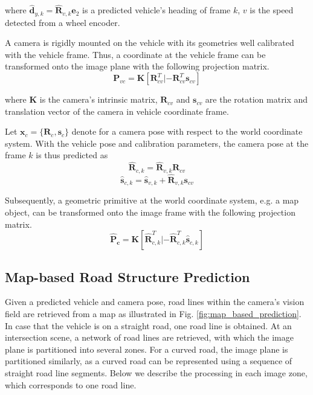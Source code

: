 \documentclass[letterpaper, 10 pt, conference]{ieeeconf}  %
\begin{document}
where $\hat{\mathbf{d}}_{y,k}=\hat{\mathbf{R}}_{v,k}\mathbf{e}_2$ is a predicted vehicle's heading of frame $k$, $v$ is the speed detected from a wheel encoder.

A camera is rigidly mounted on the vehicle with its geometries well calibrated with the vehicle frame. Thus, a coordinate at the vehicle frame can be transformed onto the image plane with the following projection matrix.
\begin{equation}
\mathbf{P}_{vc}=\mathbf{K}[\mathbf{R}_{cv}^T|-\mathbf{R}_{cv}^T\mathbf{s}_{cv}]
\end{equation}

where $\mathbf{K}$ is the camera's intrinsic matrix, $\mathbf{R}_{cv}$ and $\mathbf{s}_{cv}$ are the rotation matrix and translation vector of the camera in vehicle coordinate frame.

Let $\mathbf{x}_{c} = \{\mathbf{R}_{c}, \mathbf{s}_{c}\}$ denote for a camera pose with respect to the world coordinate system. With the vehicle pose and calibration parameters, the camera pose at the frame $k$ is thus predicted as
\begin{equation}
\hat{\mathbf{R}}_{c,k} = \hat{\mathbf{R}}_{v,k} \mathbf{R}_{cv}
\label{eq:R_c}
\end{equation}
\begin{equation}
\hat{\mathbf{s}}_{c,k} = \hat{\mathbf{s}}_{v,k} + \hat{\mathbf{R}}_{v,k} \mathbf{s}_{cv}
\label{eq:S_c}
\end{equation}

Subsequently, a geometric primitive at the world coordinate system, e.g. a map object, can be transformed onto the image frame with the following projection matrix.
\begin{equation}
\mathbf{\hat{P}_{c}}=\mathbf{K}[\hat{\mathbf{R}}_{c,k}^T|-\hat{\mathbf{R}}_{c,k}^T\hat{\mathbf{s}}_{c,k}]
\end{equation}

\subsection{Map-based Road Structure Prediction}

Given a predicted vehicle and camera pose, road lines within the camera's vision field are retrieved from a map as illustrated in Fig. \ref{fig:map_based_prediction}. In case that the vehicle is on a straight road, one road line is obtained. At an intersection scene, a network of road lines are retrieved, with which the image plane is partitioned into several zones. For a curved road, the image plane is partitioned similarly, as a curved road can be represented using a sequence of straight road line segments. Below we describe the processing in each image zone, which corresponds to one road line.
\end{document}
